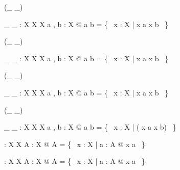 \begin{zed}
 \leftassoc (\_ \cup \_)
\end{zed}

\begin{gendef}[X]
\_ \cup \_ : \power X \cross \power X \fun \power X
\where
\forall a , b : \power X @ a \cup b = \{~ x : X | x \in a \lor x \in b ~\}
\end{gendef}

\begin{zed}
 \leftassoc (\_ \cap \_)
\end{zed}

\begin{gendef}[X]
\_ \cap \_ : \power X \cross \power X \fun \power X
\where
\forall a , b : \power X @ a \cap b = \{~ x : X | x \in a \land x \in b ~\}
\end{gendef}

\begin{zed}
 \leftassoc (\_ \setminus \_)
\end{zed}

\begin{gendef}[X]
\_ \setminus \_ : \power X \cross \power X \fun \power X
\where
\forall a , b : \power X @ a \setminus b = \{~ x : X | x \in a \land x \notin b ~\}
\end{gendef}

\begin{zed}
 \leftassoc (\_ \symdiff \_)
\end{zed}

\begin{gendef}[X]
\_ \symdiff \_ : \power X \cross \power X \fun \power X
\where
\forall a , b : \power X @ a \symdiff b = \{~ x : X | \lnot ( x \in a \iff x \in b) ~\}
\end{gendef}

\begin{gendef}[X]
\bigcup : \power \power X  \fun \power X
\where
\forall A : \power \power X @ \bigcup A = \{~ x : X | \exists a : A @ x \in a ~\}
\end{gendef}

\begin{gendef}[X]
\bigcap : \power \power X \fun \power X
\where
\forall A : \power \power X @ \bigcap A = \{~ x : X | \forall a : A @ x \in a ~\}
\end{gendef}

